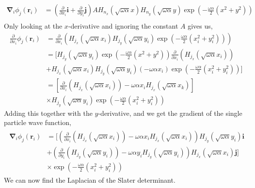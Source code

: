 \documentclass[11pt]{article}
\begin{document}
\begin{align*}
	\bm{\nabla}_i \phi_j(\mathbf{r}_i) &= \left( \frac{\partial}{\partial x_i} \mathbf{i} + \frac{\partial}{\partial y_i} \mathbf{j} \right) AH_{n_x} (\sqrt{\omega\alpha}x) H_{n_y} (\sqrt{\omega\alpha} y) \exp{\left(-\frac{\omega\alpha}{2}\left( x^2 + y^2 \right)\right)} \\
\end{align*}
Only looking at the $x$-derivative and ignoring the constant $A$ gives us,
\begin{align*}
	\frac{\partial}{\partial x_i} \phi_j(\mathbf{r}_i) &= \frac{\partial}{\partial x_i} \left(H_{j_x} (\sqrt{\omega\alpha}x_i) H_{j_y} (\sqrt{\omega\alpha} y_i) \exp{\left(-\frac{\omega\alpha}{2}\left( x_i^2 + y_i^2 \right)\right)} \right) \\
	&= \bigg[ H_{j_y} (\sqrt{\omega\alpha} y_i) \exp{\left(-\frac{\omega\alpha}{2}\left( x^2 + y^2 \right)\right)}\frac{\partial}{\partial x_i}\left( H_{j_x} (\sqrt{\omega\alpha}x_i) \right) \\
	&+ H_{j_x} (\sqrt{\omega\alpha}x_i) H_{j_y} (\sqrt{\omega\alpha} y_i) (-\omega\alpha x_i) \exp{\left(-\frac{\omega\alpha}{2}\left( x_i^2 + y_i^2 \right)\right)} \bigg] \\
	&= \left[ \frac{\partial}{\partial x_i}\left( H_{j_x} (\sqrt{\omega\alpha}x_i) \right) - \omega\alpha x_i H_{j_x} (\sqrt{\omega\alpha}x_k) \right] \\
	&\times H_{j_y} (\sqrt{\omega\alpha} y_i)\exp{\left(-\frac{\omega\alpha}{2}\left( x_i^2 + y_i^2 \right)\right)}
\end{align*}
Adding this together with the $y$-derivative, and we get the gradient of the single particle wave function,
\begin{align}
	\begin{split}
		\bm{\nabla}_i \phi_j (\mathbf{r}_i) &= \bigg[ \left( \frac{\partial}{\partial x_i}\left( H_{j_x} (\sqrt{\omega\alpha}x_i) \right) - \omega\alpha x_i H_{j_x} (\sqrt{\omega\alpha}x_i) \right) H_{j_y} (\sqrt{\omega\alpha} y_i) \mathbf{i} \\
		&+ \left( \frac{\partial}{\partial y_i}\left( H_{j_y} (\sqrt{\omega\alpha}y_i) \right) - \omega\alpha y_i H_{j_y} (\sqrt{\omega\alpha}y_i) \right) H_{j_x} (\sqrt{\omega\alpha} x_i) \mathbf{j}	\bigg] \\
		& \times \exp{\left(-\frac{\omega\alpha}{2}\left( x_i^2 + y_i^2 \right)\right)}
	\end{split}
	\label{eq:wf-sp-gradient}
\end{align}
We can now find the Laplacian of the Slater determinant. 
\end{document}
